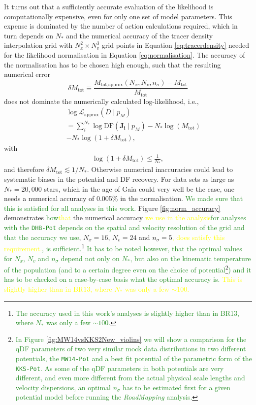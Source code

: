 \documentclass[iop,revtex4,numberedappendix,appendixfloats]{emulateapj}
\newcommand{\vect}[1]{\boldsymbol{#1}}
\newcommand{\pmodel}{\ensuremath{p_M}}
\newcommand{\RM}{{\sl RoadMapping}}
\newcommand{\NEW}[1]{\textcolor{ForestGreen}{#1}}
\newcommand{\OLD}[1]{\textcolor{Yellow}{#1}}%
\begin{document}
It turns out that a sufficiently accurate evaluation of the likelihood is computationally expensive, even for only one set of model parameters. This expense is dominated by the number of action calculations required, which in turn depends on $N_*$ and the numerical accuracy of the tracer density interpolation grid with $N_x^2 \times N_v^3$ grid points in Equation \eqref{eq:tracerdensity} needed for the likelihood normalisation in Equation \eqref{eq:normalisation}. The accuracy of the normalisation has to be chosen high enough, such that the resulting numerical error 
\begin{equation}
\delta M_\text{tot} \equiv \frac{M_\text{tot,approx}(N_x,N_v,n_\sigma) -  M_\text{tot} }{M_\text{tot}}\label{eq:relerrlikelihood}
\end{equation}
does not dominate the numerically calculated log-likelihood, i.e.,
\begin{eqnarray}
& &\log \mathscr{L}_\text{approx}(D \mid \pmodel) \nonumber\\
&& = \sum_i^{N_*} \log \text{DF}(\vect{J_i} \mid \pmodel) - N_* \log(M_\text{tot})\nonumber\\
&& - N_* \log (1 + \delta M_\text{tot}),\label{eq:loglikelihood_relerr}
\end{eqnarray}
with
\begin{eqnarray}
\log (1 + \delta M_\text{tot}) \leq \frac{1}{N_{*}},\label{eq:accuracycondition}
\end{eqnarray}
and therefore $\delta M_\text{tot} \lesssim 1/N_*$. Otherwise numerical inaccuracies could lead to systematic biases in the potential and DF recovery. For data sets as large as $N_* = 20,000$ stars, which in the age of Gaia could very well be the case, one needs a numerical accuracy of 0.005\% in the normalisation. \NEW{We made sure that this is satisfied for all analyses in this work.} Figure \ref{fig:norm_accuracy} demonstrates \NEW{how}\OLD{that} the numerical accuracy \OLD{we use in the analysis}\NEW{for analyses with the \texttt{DHB-Pot} depends on the spatial and velocity resolution of the grid and that the accuracy we use}, $N_x=16$, $N_v=24$ and $n_\sigma=5$\OLD{, does satisfy this requirement.}\NEW{, is sufficient.}\footnote{\NEW{The accuracy used in this work's analyses is slightly higher than in BR13, where $N_*$ was only a few $\sim 100$.}} \NEW{It has to be noted however, that the optimal values for $N_x$, $N_v$ and $n_\sigma$ depend not only on $N_*$, but also on the kinematic temperature of the population (and to a certain degree even on the choice of potential}\footnote{\NEW{In Figure \ref{fig:MW14vsKKS2New_violins} we will show a comparison for the qDF parameters of two very similar mock data distributions in two different potentials, the \texttt{MW14-Pot} and a best fit potential of the parametric form of the \texttt{KKS-Pot}. As some of the qDF parameters in both potentials are very different, and even more different from the actual physical scale lengths and velocity dispersions, an optimal $n_\sigma$ has to be estimated first for a given potential model before running the \RM{} analysis.}}\NEW{) and it has to be checked on a case-by-case basis what the optimal accuracy is.} \OLD{This is slightly higher than in BR13, where $N_*$ was only a few $\sim 100$.}
\end{document}
